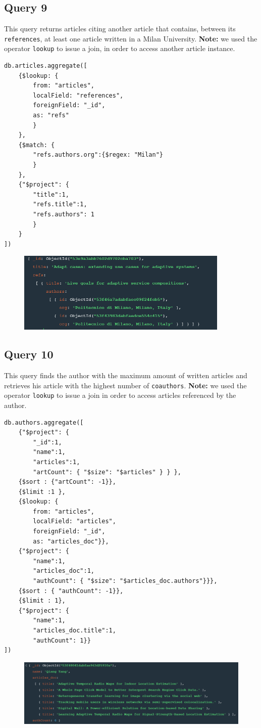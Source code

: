 \documentclass{Configuration_Files/PoliMi3i_thesis}
\begin{document}
\subsection{Query 9}
This query returns articles citing another article that contains, between its \verb |references|, at least one
article written in a Milan University. \newline
\textbf{Note:} we used the operator \verb |lookup| to issue a join, in order to access another article instance.
\begin{lstlisting}
db.articles.aggregate([
	{$lookup: {
		from: "articles",
		localField: "references",
		foreignField: "_id",
		as: "refs"
		}
	},
	{$match: {
		"refs.authors.org":{$regex: "Milan"}
		}
	},
	{"$project": {
		"title":1,
		"refs.title":1,
		"refs.authors": 1
		}
	}
])
\end{lstlisting}
\begin{figure}[H]
\centering
\includegraphics[width=0.9\textwidth]{query/mongo_q9.PNG}
\label{fig:query9}
\end{figure}

\subsection{Query 10}
This query finds the author with the maximum amount of written articles and retrieves his article with the highest number
of \verb |coauthors|.\newline
\textbf{Note:} we used the operator \verb |lookup| to issue a join in order to access articles referenced by the author.
\begin{lstlisting}
db.authors.aggregate([
	{"$project": {
		"_id":1,
		"name":1,
		"articles":1,
		"artCount": { "$size": "$articles" } } },
	{$sort : {"artCount": -1}},
	{$limit :1 },
	{$lookup: {
		from: "articles",
		localField: "articles",
		foreignField: "_id",
		as: "articles_doc"}},
	{"$project": {
		"name":1,
		"articles_doc":1,
		"authCount": { "$size": "$articles_doc.authors"}}},
	{$sort : { "authCount": -1}},
	{$limit : 1},
	{"$project": {
		"name":1,
		"articles_doc.title":1,
		"authCount": 1}}
])
\end{lstlisting}
\begin{figure}[H]
\centering
\includegraphics[width=1\textwidth]{query/mongo_q10.PNG}
\label{fig:query10}
\end{figure}
\end{document}
